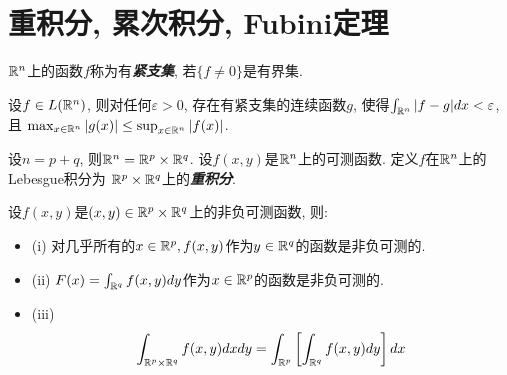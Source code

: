 \documentclass[12pt, a4paper, oneside, UTF8]{ctexbook}  %
\begin{document}
\section{重积分, 累次积分, Fubini定理}

\begin{defn}
    $\mathbb{R}^n$上的函数$f$称为有\textbf{\emph{紧支集}}, 若$\{f\neq 0\}$是有界集.
\end{defn}

\begin{thm}\label{jzj}
    设$f\in L(\mathbb{R}^n)$, 则对任何$\varepsilon >0$, 存在有紧支集的连续函数$g$, 使得$\int_{\mathbb{R}^n}|f-g|dx<\varepsilon$, 且
    $\max_{x\in\mathbb{R}^n}|g(x)|\leq \sup_{x\in\mathbb{R}^n}|f(x)|$.
\end{thm}

\begin{defn}
    设$n = p+q$, 则$\mathbb{R}^n = \mathbb{R}^p \times \mathbb{R}^q$. 设$f(x, y)$是$\mathbb{R}^n$上的可测函数. 定义$f$在$\mathbb{R}^n$上的 Lebesgue积分为
    $\mathbb{R}^p \times \mathbb{R}^q$上的\textbf{\emph{重积分}}. 
\end{defn}

\begin{thm}[Tonelli]\label{Tonelli}
    设$f(x, y)$是$(x, y)\in \mathbb{R}^p\times\mathbb{R}^q$上的非负可测函数, 则:
    \begin{itemize}
        \item (i) 对几乎所有的$x\in \mathbb{R}^p, f(x, y)$作为$y\in\mathbb{R}^q$的函数是非负可测的.
        \item (ii) $F(x) = \int_{\mathbb{R}^q}f(x, y)dy$作为$x\in \mathbb{R}^p$的函数是非负可测的.
        \item (iii) \begin{equation}\label{iterate}
                        \int_{\mathbb{R}^p\times\mathbb{R}^q}f(x, y)dxdy = \int_{\mathbb{R}^p}\left[\int_{\mathbb{R}^q}f(x, y)dy\right]dx
                    \end{equation}
    \end{itemize}
\end{thm}
\end{document}
